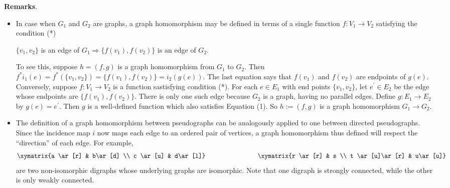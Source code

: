 \documentclass[12pt]{article}
\begin{document}
\textbf{Remarks}.  
\begin{itemize}
\item
In case when $G_1$ and $G_2$ are graphs, a graph homomorphism may be defined in terms of a single function $f:V_1\to V_2$ satisfying the condition (*)
\begin{center}
$\lbrace v_1,v_2\rbrace$ is an edge of $G_1\Longrightarrow \lbrace f(v_1),f(v_2)\rbrace$ is an edge of $G_2$.  
\end{center}
To see this, suppose $h=(f,g)$ is a graph homomorphism from $G_1$ to $G_2$.  Then $f^*i_1(e)=f^*(\lbrace v_1,v_2\rbrace)=\lbrace f(v_1),f(v_2)\rbrace=i_2(g(e))$.  The last equation says that $f(v_1)$ and $f(v_2)$ are endpoints of $g(e)$.  Conversely, suppose $f:V_1\to V_2$ is a function sastisfying condition (*).  For each $e\in E_1$ with end points $\lbrace v_1,v_2\rbrace$, let $e^{\prime}\in E_2$ be the edge whose endpoints are $\lbrace f(v_1),f(v_2)\rbrace$.  There is only one such edge because $G_2$ is a graph, having no parallel edges.  Define $g:E_1\to E_2$ by $g(e)=e^{\prime}$.  Then $g$ is a well-defined function which also satisfies Equation (1).  So $h:=(f,g)$ is a graph homomorphism $G_1\to G_2$.
\item
The definition of a graph homomorphism between pseudographs can be analogously applied to one between directed pseudographs.  Since the incidence map $i$ now maps each edge to an ordered pair of vertices, a graph homomorphism thus defined will respect the ``direction'' of each edge.  For example, 
\[
\xymatrix{a \ar[r] & b\ar[d] \\ 
c \ar[u] & d\ar[l]}
\qquad\qquad\qquad\qquad
\xymatrix{r \ar[r] & s \\ 
t \ar[u]\ar[r] & u\ar[u]}
\]
are two non-isomorphic digraphs whose underlying graphs are isomorphic.  Note that one digraph is strongly connected, while the other is only weakly connected.
\end{itemize}
\end{document}

